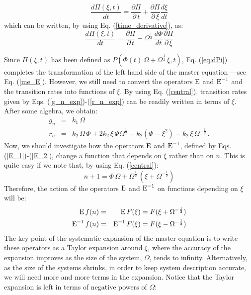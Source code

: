 \begin{enumerate}
	\begin{equation}
		\label{time_derivative_2}
		\frac{d\Pi(\xi,t)}{dt}=\frac{\partial\Pi}{\partial\,t} + \frac{\partial\Pi}{\partial\,\xi}\frac{d\xi}{dt} 
	\end{equation}
	which can be written, by using Eq. (\ref{time_derivative}), as:
	\begin{equation}
		\frac{d\Pi(\xi,t)}{dt}=\frac{\partial\Pi}{\partial\,t} - \Omega^{\frac{1}{2}}\,\frac{d\Phi}{dt} \frac{\partial\Pi}{\partial\,\xi}	
		\label{eq:dPi}
	\end{equation}
\end{enumerate}
\smallskip

Since $\Pi(\xi,t)$ has been defined as $P(\Phi(t)\,\Omega + \Omega^{\frac{1}{2}}\,\xi,t)$, Eq. (\ref{eq:dPi}) completes the transformation of the left hand side of the master equation ---see Eq. (\ref{me_E}). However, we still need to convert the operators $\textup{E}$ and $\textup{E}^{-1}$ and the transition rates into functions of $\xi$. By using Eq. (\ref{central}), transition rates given by Eqs. (\ref{g_n_exp})-(\ref{r_n_exp}) can be readily written in terms of $\xi$. After some algebra, we obtain:
\begin{eqnarray}
	\label{g_n_Exp}
	g_n & = & k_{1}\,\Omega\\
	r_n & = & k_{2}\,\Omega\,\Phi+2k_{2}\,\xi\,\Phi\Omega^{\frac{1}{2}}-k_{2}(\Phi-\xi^2) - k_{2}\,\xi\,\Omega^{-\frac{1}{2}}\,. 
	\label{r_n_Exp}
\end{eqnarray}
Now, we should investigate how the operators $\textup{E}$ and $\textup{E}^{-1}$, defined by Eqs. (\ref{E_1})-(\ref{E_2}), change a function that depends on $\xi$ rather than on $n$. This is quite easy if we note that, by using Eq. (\ref{central}):
\begin{equation}
	n+1 = \Phi\,\Omega + \Omega^{\frac{1}{2}}\,(\xi+\Omega^{-\frac{1}{2}})
\end{equation}
Therefore, the action of the operators $\textup{E}$ and $\textup{E}^{-1}$ on functions depending on $\xi$ will be:
\begin{eqnarray}
	\textup{E}\,f(n) &=& \textup{E}\,F(\xi) = F(\xi + \Omega^{-\frac{1}{2}})\\
	\textup{E}^{-1}\,f(n) &=& \textup{E}^{-1}\,F(\xi) = F(\xi - \Omega^{-\frac{1}{2}})
\end{eqnarray} 
The key point of the systematic expansion of the master equation is to write these operators as a Taylor expansion around $\xi$, where the accuracy of the expansion improves as the size of the system, $\Omega$, tends to infinity. Alternatively, as the size of the systems shrinks, in order to keep system description accurate, we will need more and more terms in the expansion. Notice that the Taylor expansion is left in terms of negative powers of $\Omega$:
